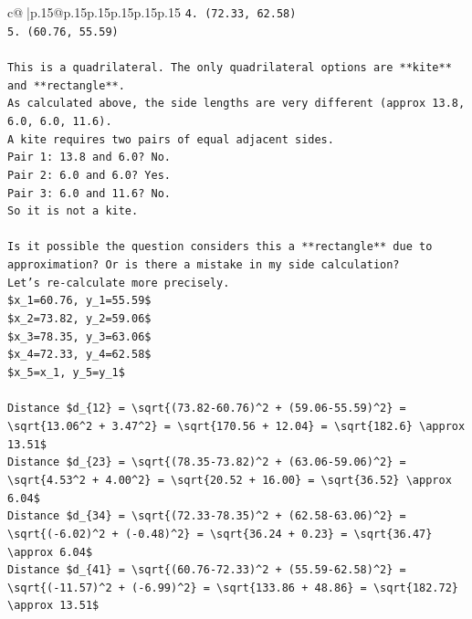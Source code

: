 \documentclass{article}
\begin{document}
{\begin{supertabular}{c@{$\;$}|p{.15\linewidth}@{}p{.15\linewidth}p{.15\linewidth}p{.15\linewidth}p{.15\linewidth}p{.15\linewidth}}
{{{\texttt{4. (72.33, 62.58)} \\
\texttt{5. (60.76, 55.59)} \\
\\ 
\texttt{This is a quadrilateral. The only quadrilateral options are **kite** and **rectangle**.} \\
\texttt{As calculated above, the side lengths are very different (approx 13.8, 6.0, 6.0, 11.6).} \\
\texttt{A kite requires two pairs of equal adjacent sides.} \\
\texttt{Pair 1: 13.8 and 6.0? No.} \\
\texttt{Pair 2: 6.0 and 6.0? Yes.} \\
\texttt{Pair 3: 6.0 and 11.6? No.} \\
\texttt{So it is not a kite.} \\
\\ 
\texttt{Is it possible the question considers this a **rectangle** due to approximation? Or is there a mistake in my side calculation?} \\
\texttt{Let's re{-}calculate more precisely.} \\
\texttt{\$x\_1=60.76, y\_1=55.59\$} \\
\texttt{\$x\_2=73.82, y\_2=59.06\$} \\
\texttt{\$x\_3=78.35, y\_3=63.06\$} \\
\texttt{\$x\_4=72.33, y\_4=62.58\$} \\
\texttt{\$x\_5=x\_1, y\_5=y\_1\$} \\
\\ 
\texttt{Distance \$d\_\{12\} = \textbackslash{}sqrt\{(73.82{-}60.76)\^{}2 + (59.06{-}55.59)\^{}2\} = \textbackslash{}sqrt\{13.06\^{}2 + 3.47\^{}2\} = \textbackslash{}sqrt\{170.56 + 12.04\} = \textbackslash{}sqrt\{182.6\} \textbackslash{}approx 13.51\$} \\
\texttt{Distance \$d\_\{23\} = \textbackslash{}sqrt\{(78.35{-}73.82)\^{}2 + (63.06{-}59.06)\^{}2\} = \textbackslash{}sqrt\{4.53\^{}2 + 4.00\^{}2\} = \textbackslash{}sqrt\{20.52 + 16.00\} = \textbackslash{}sqrt\{36.52\} \textbackslash{}approx 6.04\$} \\
\texttt{Distance \$d\_\{34\} = \textbackslash{}sqrt\{(72.33{-}78.35)\^{}2 + (62.58{-}63.06)\^{}2\} = \textbackslash{}sqrt\{({-}6.02)\^{}2 + ({-}0.48)\^{}2\} = \textbackslash{}sqrt\{36.24 + 0.23\} = \textbackslash{}sqrt\{36.47\} \textbackslash{}approx 6.04\$} \\
\texttt{Distance \$d\_\{41\} = \textbackslash{}sqrt\{(60.76{-}72.33)\^{}2 + (55.59{-}62.58)\^{}2\} = \textbackslash{}sqrt\{({-}11.57)\^{}2 + ({-}6.99)\^{}2\} = \textbackslash{}sqrt\{133.86 + 48.86\} = \textbackslash{}sqrt\{182.72\} \textbackslash{}approx 13.51\$} \\
}}}
\end{supertabular}}
\end{document}
